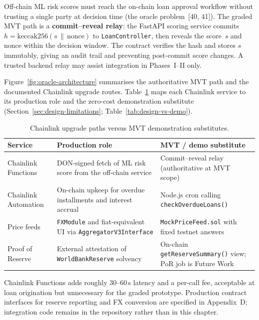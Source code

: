 \documentclass[12pt,a4paper]{report}
\newcommand{\tableheadcolor}{\rowcolor{TableHeadBg}}
\begin{document}
Off-chain ML risk scores must reach the on-chain loan approval workflow without trusting a single party at decision time (the oracle problem~[40, 41]). The graded MVT path is a \textbf{commit--reveal relay}: the FastAPI scoring service commits $h = \text{keccak256}(s \,\|\, \text{nonce})$ to \texttt{LoanController}, then reveals the score~$s$ and nonce within the decision window. The contract verifies the hash and stores $s$ immutably, giving an audit trail and preventing post-commit score changes. A trusted backend relay may assist integration in Phases~I--II only.

Figure~\ref{fig:oracle-architecture} summarises the authoritative MVT path and the documented Chainlink upgrade routes. Table~\ref{tab:chainlink-upgrade-paths} maps each Chainlink service to its production role and the zero-cost demonstration substitute (Section~\ref{sec:design-limitations}; Table~\ref{tab:design-vs-demo}).

\begin{table}[H]
\centering
\caption[Chainlink upgrade paths versus MVT substitutes]{Chainlink upgrade paths versus MVT demonstration substitutes.}
\label{tab:chainlink-upgrade-paths}
\small
\begin{tabular}{@{}p{2.6cm}p{4.8cm}p{5.8cm}@{}}
\toprule
\tableheadcolor
\textbf{Service} & \textbf{Production role} & \textbf{MVT / demo substitute} \\
\midrule
Chainlink Functions &
  DON-signed fetch of ML risk score from the off-chain service &
  Commit--reveal relay (authoritative at MVT scope) \\
\rowcolor{RowShade}
Chainlink Automation &
  On-chain upkeep for overdue installments and interest accrual &
  Node.js cron calling \texttt{checkOverdueLoans()} \\
Price feeds &
  \texttt{FXModule} and fiat-equivalent UI via \texttt{AggregatorV3Interface} &
  \texttt{MockPriceFeed.sol} with fixed testnet answers \\
\rowcolor{RowShade}
Proof of Reserve &
  External attestation of \texttt{WorldBankReserve} solvency &
  On-chain \texttt{getReserveSummary()} view; PoR job is Future Work \\
\bottomrule
\end{tabular}
\end{table}

Chainlink Functions adds roughly 30--60\,s latency and a per-call fee, acceptable at loan origination but unnecessary for the graded prototype. Production contract interfaces for reserve reporting and FX conversion are specified in Appendix~D; integration code remains in the repository rather than in this chapter.
\end{document}
